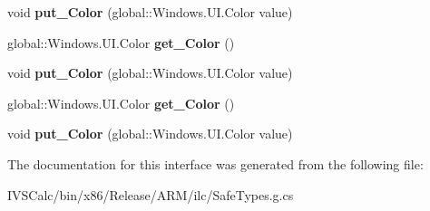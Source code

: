 \begin{DoxyCompactItemize}
\mbox{\label{interface_windows_1_1_u_i_1_1_xaml_1_1_media_1_1_i_solid_color_brush_adcc88b29f014d931f231fe7e2cdf27cc}} 
void {\bfseries put\+\_\+\+Color} (global\+::\+Windows.\+U\+I.\+Color value)
\item 
\mbox{\label{interface_windows_1_1_u_i_1_1_xaml_1_1_media_1_1_i_solid_color_brush_a709fba8664ac89aa1efe18331e59ece7}} 
global\+::\+Windows.\+U\+I.\+Color {\bfseries get\+\_\+\+Color} ()
\item 
\mbox{\label{interface_windows_1_1_u_i_1_1_xaml_1_1_media_1_1_i_solid_color_brush_adcc88b29f014d931f231fe7e2cdf27cc}} 
void {\bfseries put\+\_\+\+Color} (global\+::\+Windows.\+U\+I.\+Color value)
\item 
\mbox{\label{interface_windows_1_1_u_i_1_1_xaml_1_1_media_1_1_i_solid_color_brush_a709fba8664ac89aa1efe18331e59ece7}} 
global\+::\+Windows.\+U\+I.\+Color {\bfseries get\+\_\+\+Color} ()
\item 
\mbox{\label{interface_windows_1_1_u_i_1_1_xaml_1_1_media_1_1_i_solid_color_brush_adcc88b29f014d931f231fe7e2cdf27cc}} 
void {\bfseries put\+\_\+\+Color} (global\+::\+Windows.\+U\+I.\+Color value)
\end{DoxyCompactItemize}


The documentation for this interface was generated from the following file\+:\begin{DoxyCompactItemize}
\item 
I\+V\+S\+Calc/bin/x86/\+Release/\+A\+R\+M/ilc/Safe\+Types.\+g.\+cs\end{DoxyCompactItemize}

